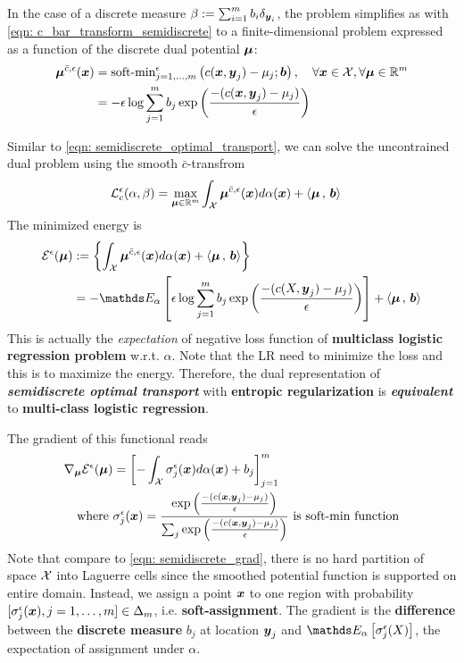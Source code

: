 \documentclass[11pt]{article}
\begin{document}
In the case of a discrete measure $\beta := \sum_{i=1}^{m}b_i \delta_{\boldsymbol{y}_{i}}$, the problem simplifies as with \eqref{eqn: c_bar_transform_semidiscrete} to a finite-dimensional problem expressed as a function of the discrete dual potential $\boldsymbol{\mu}$:
\begin{align}
\boldsymbol{\mu}^{\bar{c},\epsilon}(\boldsymbol{x}) &= \text{soft-min}^{\epsilon}_{j=1,\ldots, m}\left(c(\boldsymbol{x}, \boldsymbol{y}_j) - \mu_{j}; \boldsymbol{b}\right), \quad \forall \boldsymbol{x}\in {\mathcal X}, \forall \boldsymbol{\mu} \in {\mathbb R}^{m} \label{eqn: smooth_c_bar_transform_semidiscrete} \\
&=  -\epsilon \log \sum_{j=1}^{m} b_{j} \exp\left(\frac{-(c(\boldsymbol{x},  \boldsymbol{y}_{j}) - \mu_{j})}{\epsilon}\right)\nonumber
\end{align}

Similar to \eqref{eqn: semidiscrete_optimal_transport}, we can solve the uncontrained dual problem using the smooth $\bar{c}$-transfrom
\begin{align}
{\mathcal L}_{c}^{\epsilon}(\alpha, \beta) &= \max_{\boldsymbol{\mu}  \in  {\mathbb R}^{m}} \int_{{\mathcal X}}\boldsymbol{\mu}^{\bar{c},\epsilon}(\boldsymbol{x}) d\alpha(\boldsymbol{x}) + \left\langle \boldsymbol{\mu}\,,\, \boldsymbol{b} \right\rangle \label{eqn: semidiscrete_optimal_transport_ent}
\end{align}
The minimized energy is 
\begin{align}
\cE^{\epsilon}(\mb{\mu})&:= \set{\int_{\cX}\mb{\mu}^{\bar{c},\epsilon}(\mb{x})  d\alpha(\mb{x})+ \inn{\mb{\mu}}{\mb{b}}}  \label{eqn: semidiscrete_optimal_transport_ent_obj} \\
&=-\E{\alpha}{\epsilon \log \sum_{j=1}^{m} b_{j} \exp\paren{\frac{-(c(X,  \mb{y}_{j}) - \mu_{j})}{\epsilon}} } + \inn{\mb{\mu}}{\mb{b}}  \nonumber
\end{align} This is actually the \emph{expectation} of negative loss function of  \textbf{multiclass logistic regression problem} w.r.t. $\alpha$.  Note that the LR need to minimize the loss and this is to maximize the energy.   Therefore,  the dual representation of \emph{\textbf{semidiscrete optimal transport}} with \textbf{entropic regularization} is \emph{\textbf{equivalent}} to \textbf{multi-class logistic regression}. 

The gradient of this functional reads
\begin{align}
\nabla_{\boldsymbol{\mu}}{{\mathcal E}^{\epsilon}(\boldsymbol{\mu})} &= \left[-\int_{{\mathcal X}}\sigma_{j}^{\epsilon}(\boldsymbol{x})d\alpha(\boldsymbol{x})  + b_{j}\right]_{j=1}^{m}  \label{eqn: semidiscrete_ent_grad} \\
\text{where }& \sigma_{j}^{\epsilon}(\boldsymbol{x}) = \frac{ \exp\left(\frac{-(c(\boldsymbol{x},  \boldsymbol{y}_{j}) - \mu_{j})}{\epsilon}\right)}{\sum_{j} \exp\left(\frac{-(c(\boldsymbol{x},  \boldsymbol{y}_{j}) - \mu_{j})}{\epsilon}\right)}\text{ is soft-min function}
\end{align} Note that compare to \eqref{eqn: semidiscrete_grad}, there is no hard partition of space ${\mathcal X}$ into Laguerre cells since the smoothed potential function is supported on entire domain. Instead, we assign a point $\boldsymbol{x}$ to one region with probability $[\sigma_{j}^{\epsilon}(\boldsymbol{x}), j=1,\ldots, m] \in \Delta_{m}$, i.e. \textbf{soft-assignment}. The gradient is the \textbf{difference} between the \textbf{discrete measure} $b_j$ at location $\boldsymbol{y}_j$ and $\E{\alpha}{\sigma_{j}^{\epsilon}(X)}$, the expectation of assignment under $\alpha$. 
\end{document}
